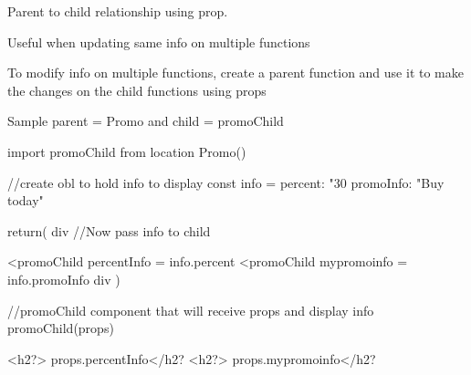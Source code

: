 Parent to child relationship using prop. 

Useful when updating same info on multiple functions

To modify info on multiple functions, create a parent function and use it to make the changes on the
child functions using props 

Sample
parent = Promo and child = promoChild

import promoChild from location 
Promo(){
    //create obl to hold info to display 
    const info = { 
        percent: "30%
        promoInfo: "Buy today"}

    return(
        div
    //Now pass info to child 

    <promoChild percentInfo = {info.percent}
    <promoChild mypromoinfo = {info.promoInfo}
        div
    )
}


//promoChild component that will receive props and display info
promoChild(props){
    <h2?> {props.percentInfo}</h2?
    <h2?> {props.mypromoinfo}</h2?

}